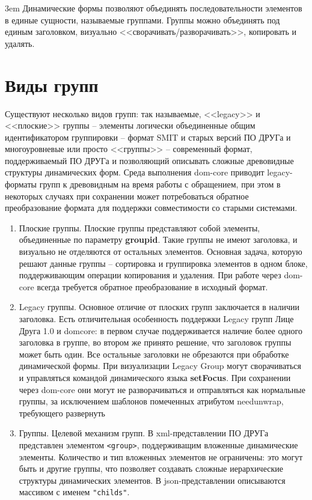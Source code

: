 \documentclass[../index.tex]{subfiles}
\begin{document}
	\emergencystretch 3em
    Динамические формы позволяют объединять последовательности элементов в единые сущности, называемые группами. Группы можно объединять под единым заголовком, визуально <<сворачивать/разворачивать>>, копировать и удалять.

\section{Виды групп}
        Существуют несколько видов групп: так называемые, <<legacy>> и <<плоские>> группы -- элементы логически объединенные общим идентификатором группировки -- формат SMIT и старых версий  ПО ДРУГа и многоуровневые или просто <<группы>> -- современный формат, поддерживаемый ПО ДРУГа и позволяющий описывать сложные древовидные структуры динамических форм. Среда выполнения dom-core
        приводит legacy-форматы групп к древовидным на время работы с обращением, при этом в некоторых случаях при сохранении может потребоваться обратное преобразование формата для поддержки совместимости со старыми системами.
\begin{enumerate}
    \item Плоские группы. Плоские группы представляют собой элементы, объединенные по параметру \textbf{groupid}. Такие группы не имеют заголовка, и визуально не отделяются от остальных элементов. Основная задача, которую решают данные группы -- сортировка и группировка элементов в одном блоке, поддерживающим операции копирования и удаления. При работе через dom-core всегда требуется обратное преобразование в исходный формат.
    \item Legacy группы. Основное отличие от плоских групп заключается в наличии заголовка. Есть отличительная особенность поддержки Legacy групп Лице Друга 1.0 и domcore: в первом случае поддерживается наличие более одного заголовка в группе, во втором же принято решение, что заголовок группы может быть один. Все остальные заголовки не обрезаются при обработке динамической формы. При визуализации Legacy Group могут сворачиваться и управляться командой динамического языка \textbf{setFocus}. При сохранении через dom-core они могут не разворачиваться и отправляться как нормальные группы, за исключением шаблонов помеченных атрибутом needunwrap, требующего развернуть
    \item Группы. Целевой механизм групп. В xml-представлении ПО ДРУГа представлен элементом \verb|<group>|, поддерживащим вложенные
    динамические элементы. Количество и тип вложенных элементов не ограничены: это могут быть и другие группы, что позволяет создавать сложные иерархические структуры динамических элементов. В json-представлении описываются массивом с именем \verb|"childs"|.
\end{enumerate}
\end{document}
